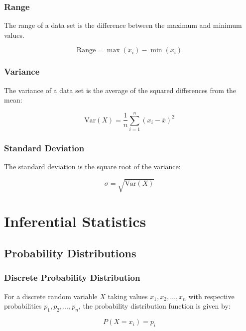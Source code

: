 \documentclass{article}
\begin{document}
\subsubsection{Range}

The range of a data set is the difference between the maximum and minimum values.

\begin{equation}
    \text{Range} = \max(x_i) - \min(x_i)
\end{equation}

\subsubsection{Variance}

The variance of a data set is the average of the squared differences from the mean:

\begin{equation}
    \text{Var}(X) = \frac{1}{n} \sum_{i=1}^{n} (x_i - \bar{x})^2
\end{equation}

\subsubsection{Standard Deviation}

The standard deviation is the square root of the variance:

\begin{equation}
    \sigma = \sqrt{\text{Var}(X)}
\end{equation}

\section{Inferential Statistics}

\subsection{Probability Distributions}

\subsubsection{Discrete Probability Distribution}

For a discrete random variable $X$ taking values $x_1, x_2, \ldots, x_n$ with respective probabilities $p_1, p_2, \ldots, p_n$, the probability distribution function is given by:

\begin{equation}
    P(X = x_i) = p_i
\end{equation}
\end{document}
